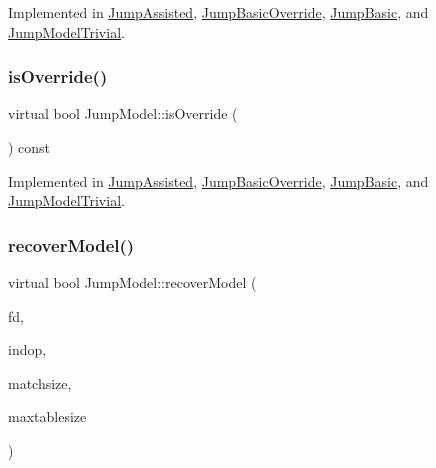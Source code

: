 Implemented in \mbox{\hyperlink{class_jump_assisted_a4d6285c9afd737070fe335b86d7592fa}{Jump\+Assisted}}, \mbox{\hyperlink{class_jump_basic_override_a49b889abc5b5f57fe22b6cbc17e03f64}{Jump\+Basic\+Override}}, \mbox{\hyperlink{class_jump_basic_abef7f04911739ec301f393f072a1c9c5}{Jump\+Basic}}, and \mbox{\hyperlink{class_jump_model_trivial_a850ec9c73e9acc78465d896008b265fe}{Jump\+Model\+Trivial}}.

\mbox{\label{class_jump_model_af54c70c0bcedfcf45ed1ce6895d9e2db}} 
\subsubsection{\texorpdfstring{isOverride()}{isOverride()}}
{\footnotesize\ttfamily virtual bool Jump\+Model\+::is\+Override (\begin{DoxyParamCaption}\item[{void}]{ }\end{DoxyParamCaption}) const\hspace{0.3cm}{\ttfamily [pure virtual]}}



Implemented in \mbox{\hyperlink{class_jump_assisted_a1169f3856b15ba64fb229deec899a49b}{Jump\+Assisted}}, \mbox{\hyperlink{class_jump_basic_override_a5ab5ce54ef01c3839fe62f97c967cbd2}{Jump\+Basic\+Override}}, \mbox{\hyperlink{class_jump_basic_a9f923a2aaeb571981a8ae758670d20f5}{Jump\+Basic}}, and \mbox{\hyperlink{class_jump_model_trivial_a30aedefb694d84c374a6dff13002cae7}{Jump\+Model\+Trivial}}.

\mbox{\label{class_jump_model_a9c2326278dd18c9d78dd5cd5795e802b}} 
\subsubsection{\texorpdfstring{recoverModel()}{recoverModel()}}
{\footnotesize\ttfamily virtual bool Jump\+Model\+::recover\+Model (\begin{DoxyParamCaption}\item[{\mbox{\hyperlink{class_funcdata}{Funcdata}} $\ast$}]{fd,  }\item[{\mbox{\hyperlink{class_pcode_op}{Pcode\+Op}} $\ast$}]{indop,  }\item[{uint4}]{matchsize,  }\item[{uint4}]{maxtablesize }\end{DoxyParamCaption})\hspace{0.3cm}{\ttfamily [pure virtual]}}



